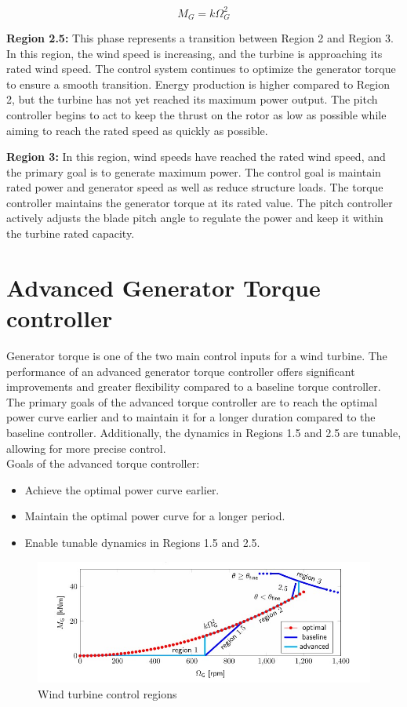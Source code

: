 \begin{equation}
	M_{G} = k\Omega_{G}^2
\end{equation}

\textbf{Region 2.5:} This phase represents a transition between Region 2 and Region 3. In this region, the wind speed is increasing, and the turbine is approaching its rated wind speed. The control system continues to optimize the generator torque to ensure a smooth transition. Energy production is higher compared to Region 2, but the turbine has not yet reached its maximum power output. The pitch controller begins to act to keep the thrust on the rotor as low as possible while aiming to reach the rated speed as quickly as possible.


\textbf{Region 3:} In this region, wind speeds have reached the rated wind speed, and the primary goal is to generate maximum power. The control goal is maintain rated power and generator speed as well as reduce structure loads. The torque controller maintains the generator torque at its rated value. The pitch controller actively adjusts the blade pitch angle to regulate the power and keep it within the turbine rated capacity.

\section{Advanced Generator Torque controller}
Generator torque is one of the two main control inputs for a wind turbine. The performance of an advanced generator torque controller offers significant improvements and greater flexibility compared to a baseline torque controller. The primary goals of the advanced torque controller are to reach the optimal power curve earlier and to maintain it for a longer duration compared to the baseline controller. Additionally, the dynamics in Regions 1.5 and 2.5 are tunable, allowing for more precise control.
\\[16pt]
Goals of the advanced torque controller:

\begin{itemize}
	\item Achieve the optimal power curve earlier.
	\item Maintain the optimal power curve for a longer period.
	\item Enable tunable dynamics in Regions 1.5 and 2.5.
\end{itemize}

\begin{figure}[htbp]
	\centering
	\includegraphics[width=\textwidth]{Figures/Figure_3.jpg}
	\caption{Wind turbine control regions}
\end{figure}

